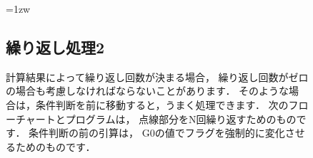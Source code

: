 \begin{figure}[btp]
\begin{framed}{\parindent=1zw
\subsection*{繰り返し処理2}
計算結果によって繰り返し回数が決まる場合，
繰り返し回数がゼロの場合も考慮しなければならないことがあります．
そのような場合は，条件判断を前に移動すると，うまく処理できます．
次のフローチャートとプログラムは，
点線部分をN回繰り返すためのものです．
条件判断の前の引算は，
G0の値でフラグを強制的に変化させるためのものです．

\begin{center}
\end{center}
}\end{framed}
\end{figure}

